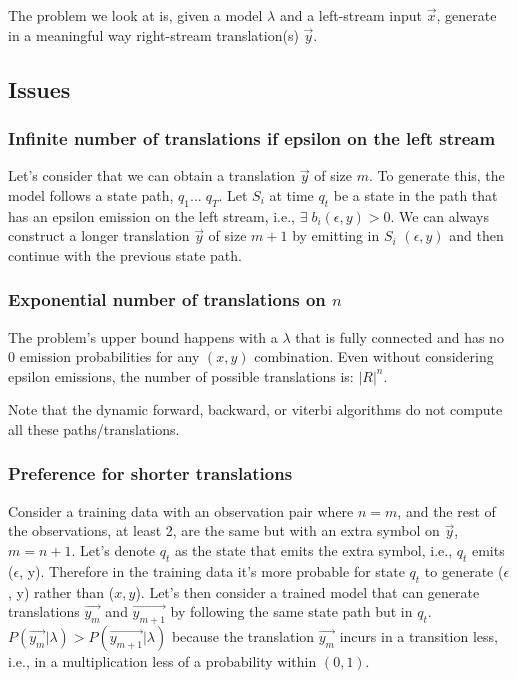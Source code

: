 \documentclass[a4paper,10pt]{article}
\begin{document}
The problem we look at is, given a model $\lambda$ and a left-stream input
$\vec{x}$, generate in a meaningful way right-stream translation(s) $\vec{y}$.

\subsection{Issues}

\subsubsection{Infinite number of translations if epsilon on the left stream}

Let's consider that we can obtain a translation $\vec{y}$ of size $m$. To
generate this, the model follows a state path, $q_1 ... \; q_T$. Let $S_i$ at
time $q_t$ be a state in the path that has an epsilon emission on the left
stream, i.e., $\exists \; b_i(\epsilon, y) > 0$. We can always construct a
longer translation $\vec{y}$ of size $m+1$ by emitting in $S_i$ $(\epsilon, y)$
and then continue with the previous state path.

\subsubsection{Exponential number of translations on $n$}

The problem's upper bound happens with a $\lambda$ that is fully connected and
has no 0 emission probabilities for any $(x, y)$ combination. Even without
considering epsilon emissions, the number of possible translations is:
${|R|}^n$.

Note that the dynamic forward, backward, or viterbi algorithms do not compute
all these paths/translations.

\subsubsection{Preference for shorter translations}\label{sec:shorter_more}

Consider a training data with an observation pair where $n = m$, and the rest of
the observations, at least 2, are the same but with an extra symbol on
$\vec{y}$, $m = n + 1$. Let's denote $q_t$ as the state that emits the extra
symbol, i.e., $q_t$ emits ($\epsilon$, y). Therefore in the training data it's
more probable for state $q_t$ to generate ($\epsilon$, y) rather than ($x,
y$). Let's then consider a trained model that can generate translations
$\vec{y_m}$ and $\vec{y_{m+1}}$ by following the same state path but in
$q_t$. $P(\vec{y_m}|\lambda) > P(\vec{y_{m+1}}|\lambda)$ because the translation
$\vec{y_m}$ incurs in a transition less, i.e., in a multiplication less of a
probability within $(0, 1)$.
\end{document}
